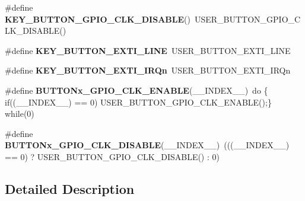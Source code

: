 \begin{DoxyCompactItemize}
\#define {\bfseries K\+E\+Y\+\_\+\+B\+U\+T\+T\+O\+N\+\_\+\+G\+P\+I\+O\+\_\+\+C\+L\+K\+\_\+\+D\+I\+S\+A\+B\+LE}()~U\+S\+E\+R\+\_\+\+B\+U\+T\+T\+O\+N\+\_\+\+G\+P\+I\+O\+\_\+\+C\+L\+K\+\_\+\+D\+I\+S\+A\+B\+LE()
\item 
\mbox{\label{group___s_t_m32_f0_x_x___n_u_c_l_e_o___b_u_t_t_o_n_gae22d60d9f89ae7203bcd5ca8146bcef0}} 
\#define {\bfseries K\+E\+Y\+\_\+\+B\+U\+T\+T\+O\+N\+\_\+\+E\+X\+T\+I\+\_\+\+L\+I\+NE}~U\+S\+E\+R\+\_\+\+B\+U\+T\+T\+O\+N\+\_\+\+E\+X\+T\+I\+\_\+\+L\+I\+NE
\item 
\mbox{\label{group___s_t_m32_f0_x_x___n_u_c_l_e_o___b_u_t_t_o_n_gaeb5bffe8281b0754675cfdfb2847e82d}} 
\#define {\bfseries K\+E\+Y\+\_\+\+B\+U\+T\+T\+O\+N\+\_\+\+E\+X\+T\+I\+\_\+\+I\+R\+Qn}~U\+S\+E\+R\+\_\+\+B\+U\+T\+T\+O\+N\+\_\+\+E\+X\+T\+I\+\_\+\+I\+R\+Qn
\item 
\mbox{\label{group___s_t_m32_f0_x_x___n_u_c_l_e_o___b_u_t_t_o_n_gaa397abaece51f4d7aafb07fd79640f3e}} 
\#define {\bfseries B\+U\+T\+T\+O\+Nx\+\_\+\+G\+P\+I\+O\+\_\+\+C\+L\+K\+\_\+\+E\+N\+A\+B\+LE}(\+\_\+\+\_\+\+I\+N\+D\+E\+X\+\_\+\+\_\+)~do \{ if((\+\_\+\+\_\+\+I\+N\+D\+E\+X\+\_\+\+\_\+) == 0) U\+S\+E\+R\+\_\+\+B\+U\+T\+T\+O\+N\+\_\+\+G\+P\+I\+O\+\_\+\+C\+L\+K\+\_\+\+E\+N\+A\+B\+LE();\} while(0)
\item 
\mbox{\label{group___s_t_m32_f0_x_x___n_u_c_l_e_o___b_u_t_t_o_n_gaf44f31971ce49524d0243b8e37048b8f}} 
\#define {\bfseries B\+U\+T\+T\+O\+Nx\+\_\+\+G\+P\+I\+O\+\_\+\+C\+L\+K\+\_\+\+D\+I\+S\+A\+B\+LE}(\+\_\+\+\_\+\+I\+N\+D\+E\+X\+\_\+\+\_\+)~(((\+\_\+\+\_\+\+I\+N\+D\+E\+X\+\_\+\+\_\+) == 0) ? U\+S\+E\+R\+\_\+\+B\+U\+T\+T\+O\+N\+\_\+\+G\+P\+I\+O\+\_\+\+C\+L\+K\+\_\+\+D\+I\+S\+A\+B\+LE() \+: 0)
\end{DoxyCompactItemize}


\subsection{Detailed Description}
